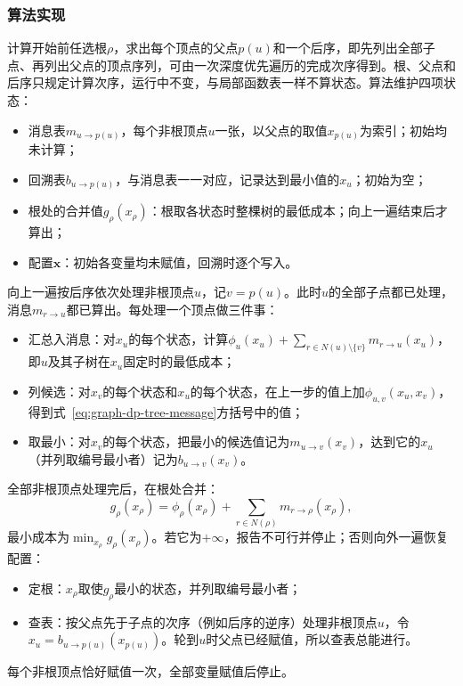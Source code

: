 \subsubsection{算法实现}

计算开始前任选根$\rho$，求出每个顶点的父点$p(u)$和一个后序，即先列出全部子点、再列出父点的顶点序列，可由一次深度优先遍历的完成次序得到。根、父点和后序只规定计算次序，运行中不变，与局部函数表一样不算状态。算法维护四项状态：
\begin{itemize}
  \item 消息表$m_{u\to p(u)}$，每个非根顶点$u$一张，以父点的取值$x_{p(u)}$为索引；初始均未计算；
  \item 回溯表$b_{u\to p(u)}$，与消息表一一对应，记录达到最小值的$x_u$；初始为空；
  \item 根处的合并值$g_\rho(x_\rho)$：根取各状态时整棵树的最低成本；向上一遍结束后才算出；
  \item 配置$\bm x$：初始各变量均未赋值，回溯时逐个写入。
\end{itemize}
向上一遍按后序依次处理非根顶点$u$，记$v=p(u)$。此时$u$的全部子点都已处理，消息$m_{r\to u}$都已算出。每处理一个顶点做三件事：
\begin{itemize}
  \item 汇总入消息：对$x_u$的每个状态，计算$\phi_u(x_u)+\sum_{r\in N(u)\setminus\{v\}}m_{r\to u}(x_u)$，即$u$及其子树在$x_u$固定时的最低成本；
  \item 列候选：对$x_v$的每个状态和$x_u$的每个状态，在上一步的值上加$\phi_{u,v}(x_u,x_v)$，得到式~\eqref{eq:graph-dp-tree-message}方括号中的值；
  \item 取最小：对$x_v$的每个状态，把最小的候选值记为$m_{u\to v}(x_v)$，达到它的$x_u$（并列取编号最小者）记为$b_{u\to v}(x_v)$。
\end{itemize}
全部非根顶点处理完后，在根处合并：
\[
g_\rho(x_\rho)=\phi_\rho(x_\rho)+\sum_{r\in N(\rho)}m_{r\to\rho}(x_\rho),
\]
最小成本为$\min_{x_\rho}g_\rho(x_\rho)$。若它为$+\infty$，报告不可行并停止；否则向外一遍恢复配置：
\begin{itemize}
  \item 定根：$x_\rho$取使$g_\rho$最小的状态，并列取编号最小者；
  \item 查表：按父点先于子点的次序（例如后序的逆序）处理非根顶点$u$，令$x_u=b_{u\to p(u)}(x_{p(u)})$。轮到$u$时父点已经赋值，所以查表总能进行。
\end{itemize}
每个非根顶点恰好赋值一次，全部变量赋值后停止。

